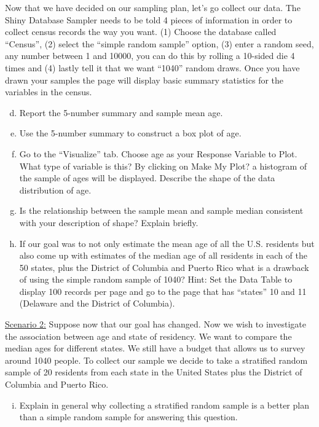 \documentclass[11pt]{isuthesis}\usepackage[]{graphicx}\usepackage[]{color}
\begin{document}
\begin{appendices}
Now that we have decided on our sampling plan, let's go collect our data.  The Shiny Database Sampler needs to be told 4 pieces of information in order to collect census records the way you want. (1) Choose the database called ``Census'', (2) select the ``simple random sample'' option, (3) enter a random seed, any number between 1 and 10000, you can do this by rolling a 10-sided die 4 times and (4) lastly tell it that we want ``1040'' random draws. Once you have drawn your samples the page will display basic summary statistics for the variables in the census.\\

\begin{enumerate}[(a)]
\setcounter{enumi}{3}
\item Report the 5-number summary and sample mean age.
\item	Use the 5-number summary to construct a box plot of age.
\item	Go to the ``Visualize'' tab.  Choose age as your Response Variable to Plot.  What type of variable is this?  By clicking on Make My Plot? a histogram of the sample of ages will be displayed.  Describe the shape of the data distribution of age.
\item	Is the relationship between the sample mean and sample median consistent with your description of shape?  Explain briefly.
\item	If our goal was to not only estimate the mean age of all the U.S. residents but also come up with estimates of the median age of all residents in each of the 50 states, plus the District of Columbia and Puerto Rico what is a drawback of using the simple random sample of 1040?  Hint: Set the Data Table to display 100 records per page and go to the page that has ``states'' 10 and 11 (Delaware and the District of Columbia).
\end{enumerate}

\underline{Scenario 2:} Suppose now that our goal has changed.  Now we wish to investigate the association between age and state of residency. We want to compare the median ages for different states. We still have a budget that allows us to survey around 1040 people. To collect our sample we decide to take a stratified random sample of 20 residents from each state in the United States plus the District of Columbia and Puerto Rico. 

\begin{enumerate}[(a)]
\setcounter{enumi}{8}
\item  Explain in general why collecting a stratified random sample is a better plan than a simple random sample for answering this question.  
\end{enumerate}


\end{appendices}
\end{document}
